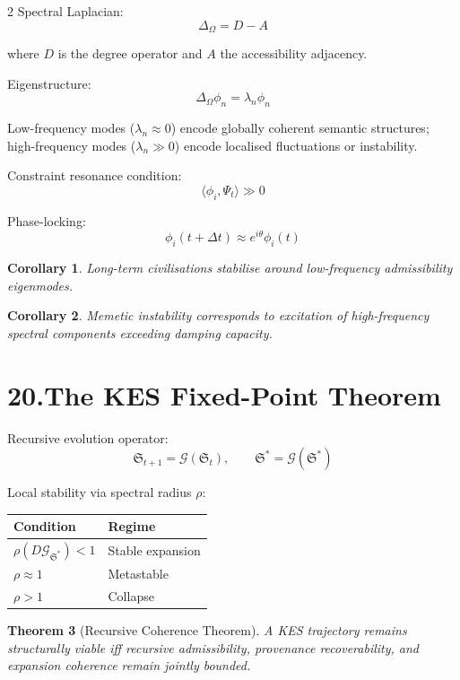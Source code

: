 \documentclass[10pt,a4paper]{article}
\theoremstyle{plain}
\newtheorem{theorem}{Theorem}[section]
\newtheorem{corollary}[theorem]{Corollary}
\theoremstyle{remark}
\newcommand{\KES}{\mathfrak{S}}
\begin{document}
\begin{multicols}{2}
Spectral Laplacian:
\[
\Delta_\Omega = D - A
\]

where $D$ is the degree operator and $A$ the accessibility adjacency.

Eigenstructure:
\[
\Delta_\Omega\phi_n = \lambda_n\phi_n
\]

Low-frequency modes ($\lambda_n\approx0$) encode globally coherent
semantic structures; high-frequency modes ($\lambda_n\gg0$) encode
localised fluctuations or instability.

Constraint resonance condition:
\[
\langle\phi_i,\Psi_t\rangle \gg 0
\]

Phase-locking:
\[
\phi_i(t+\Delta t)
\approx
e^{i\theta}\phi_i(t)
\]

\begin{corollary}
Long-term civilisations stabilise around low-frequency admissibility
eigenmodes.
\end{corollary}

\begin{corollary}
Memetic instability corresponds to excitation of high-frequency spectral
components exceeding damping capacity.
\end{corollary}

\section*{20.\enspace The KES Fixed-Point Theorem}

Recursive evolution operator:
\[
\KES_{t+1} = \mathcal{G}(\KES_t),
\qquad
\KES^* = \mathcal{G}(\KES^*)
\]

Local stability via spectral radius $\rho$:

\begin{center}
\begin{tabular}{@{}ll@{}}
\toprule
Condition & Regime \\
\midrule
$\rho(D\mathcal{G}_{\KES^*})<1$ & Stable expansion \\
$\rho\approx1$ & Metastable \\
$\rho>1$ & Collapse \\
\bottomrule
\end{tabular}
\end{center}

\begin{theorem}[Recursive Coherence Theorem]
A KES trajectory remains structurally viable iff recursive admissibility,
provenance recoverability, and expansion coherence remain jointly bounded.
\end{theorem}


\end{multicols}
\end{document}
